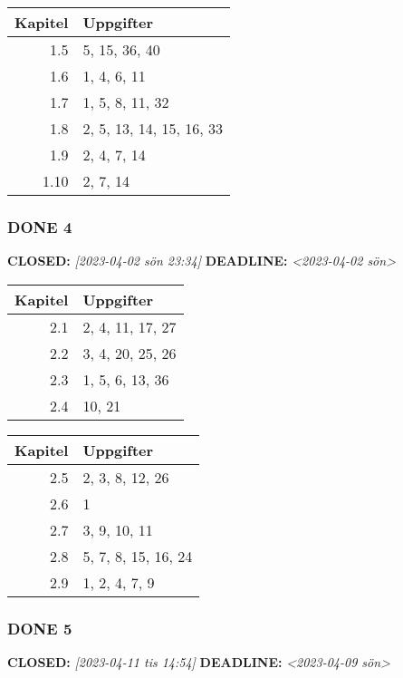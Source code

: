 \documentclass[11pt]{article}
\begin{document}
\begin{center}
\begin{tabular}{rl}
Kapitel & Uppgifter\\[0pt]
\hline
1.5 & 5, 15, 36, 40\\[0pt]
1.6 & 1, 4, 6, 11\\[0pt]
1.7 & 1, 5, 8, 11, 32\\[0pt]
1.8 & 2, 5, 13, 14, 15, 16, 33\\[0pt]
1.9 & 2, 4, 7, 14\\[0pt]
1.10 & 2, 7, 14\\[0pt]
\end{tabular}
\end{center}


\subsubsection{{\bfseries\sffamily DONE} 4}
\label{sec:org70a8246}
\noindent\textbf{CLOSED:} \textit{[2023-04-02 sön 23:34] } \textbf{DEADLINE:} \textit{<2023-04-02 sön>}\\[0pt]

\begin{center}
\begin{tabular}{rl}
Kapitel & Uppgifter\\[0pt]
\hline
2.1 & 2, 4, 11, 17, 27\\[0pt]
2.2 & 3, 4, 20, 25, 26\\[0pt]
2.3 & 1, 5, 6, 13, 36\\[0pt]
2.4 & 10, 21\\[0pt]
\end{tabular}
\end{center}


\begin{center}
\begin{tabular}{rl}
Kapitel & Uppgifter\\[0pt]
\hline
2.5 & 2, 3, 8, 12, 26\\[0pt]
2.6 & 1\\[0pt]
2.7 & 3, 9, 10, 11\\[0pt]
2.8 & 5, 7, 8, 15, 16, 24\\[0pt]
2.9 & 1, 2, 4, 7, 9\\[0pt]
\end{tabular}
\end{center}


\subsubsection{{\bfseries\sffamily DONE} 5}
\label{sec:org14b8cd7}
\noindent\textbf{CLOSED:} \textit{[2023-04-11 tis 14:54] } \textbf{DEADLINE:} \textit{<2023-04-09 sön>}\\[0pt]
\end{document}
